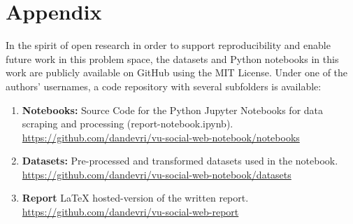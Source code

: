 \section{Appendix}

In the spirit of open research in order to support reproducibility and enable future work in this problem space, the datasets and Python notebooks in this work are publicly available on GitHub using the MIT License. 
Under one of the authors' usernames, a code repository with several subfolders is available:
\begin{enumerate}
  \item \textbf{Notebooks:} Source Code for the Python  Jupyter Notebooks for data scraping and processing (report-notebook.ipynb). \\
  \underline{https://github.com/dandevri/vu-social-web-notebook/notebooks} 
    \item \textbf{Datasets:} Pre-processed and transformed datasets used in the notebook. \\
  \underline{https://github.com/dandevri/vu-social-web-notebook/datasets}
    \item \textbf{Report} LaTeX hosted-version of the written report. \\  \underline{{https://github.com/dandevri/vu-social-web-report}}
\end{enumerate}